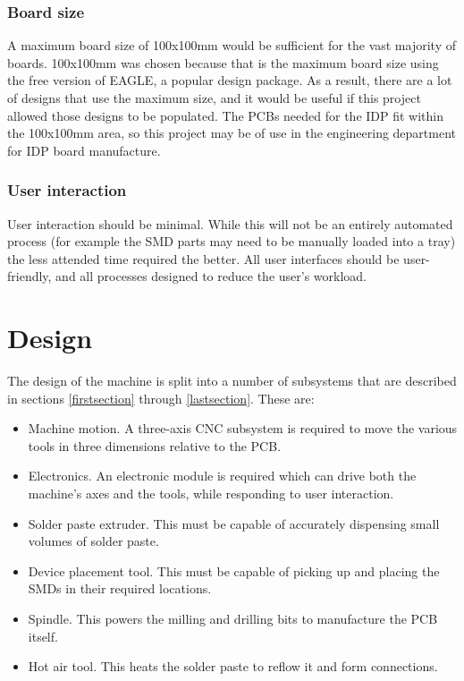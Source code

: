 \subsubsection{Board size}
A maximum board size of 100x100mm would be sufficient for the vast majority of boards. 100x100mm was chosen because that
is the maximum board size using the free version of EAGLE, a popular design package. As a result, there are a lot of designs
that use the maximum size, and it would be useful if this project allowed those designs to be populated.
The PCBs needed for the IDP fit within the 100x100mm area, so this project
may be of use in the engineering department for IDP board manufacture.

\subsubsection{User interaction}
User interaction should be minimal. While this will not be an entirely 
automated process (for example the SMD parts may need to be manually loaded
into a tray) the less attended time required the better. All user
interfaces should be user-friendly, and all processes designed to reduce
the user's workload.




\section{Design}

The design of the machine is split into a number of subsystems that are
described in sections \ref{firstsection} through \ref{lastsection}. These
are:

\begin{itemize}
	\item Machine motion. A three-axis CNC subsystem is required to move
		the various tools in three dimensions relative to the PCB.
	\item Electronics. An electronic module is required which can drive
		both the machine's axes and the tools, while responding to user
		interaction.
	\item Solder paste extruder. This must be capable of accurately
		dispensing small volumes of solder paste.
	\item Device placement tool. This must be capable of picking up and
		placing the SMDs in their required locations.
	\item Spindle. This powers the milling and drilling bits to manufacture
		the PCB itself.
	\item Hot air tool. This heats the solder paste to reflow it and form connections.
\end{itemize}


